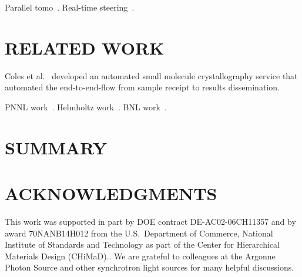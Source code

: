 \documentclass{aip-cp}
\newcommand\ben[1]{}
\newcommand\ben[1]{{\color{blue}[Ben: #1]}}
\begin{document}
\ben{cite Ward et al (BMG Nature)}


\ben{Add DLHub usage details here}

\ben{Other potential models to highlight, CANDLE Benchmarks,
Segmentation of Tomographic Reconstruction of Connectomes in Mouse Brains}



Parallel tomo~\cite{Bicer_Europar15}. Real-time steering~\cite{bicer2017real}.

\section{RELATED WORK}

Coles et al.~\cite{coles2005ecses,coles2006science} developed an automated small molecule crystallography service that automated the
end-to-end-flow from sample receipt to results dissemination.

PNNL work~\cite{thomas2015towards}. Helmholtz work~\cite{gehrke2015high}. BNL work~\cite{deslippe2014workflow}.


\section{SUMMARY}









\section{ACKNOWLEDGMENTS}

This work was supported in part by DOE contract DE-AC02-06CH11357 and by award 70NANB14H012 from the U.S.\  Department of Commerce, National Institute of Standards and Technology as part of the Center for Hierarchical Materials Design (CHiMaD)..
We are grateful to colleagues at the Argonne Photon Source and other synchrotron light sources
for many helpful discussions.


\nocite{*}
%
%
\end{document}
